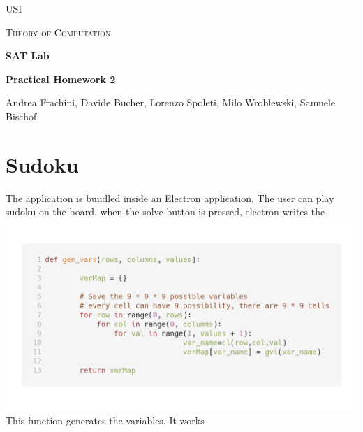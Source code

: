 \documentclass[10pt]{article}
\begin{document}
\begin{titlepage}
	\centering
  {\scshape\Large USI\par}
	{\scshape\Large Theory of Computation\par}
	\vspace{1.5cm}
	{\huge\bfseries SAT Lab\par}\vspace{0.5cm}
	{\large\bfseries Practical Homework 2\par}
	\vspace{2cm}
	{\Large Andrea Frachini, Davide Bucher, Lorenzo Spoleti, Milo Wroblewski, Samuele Bischof\par}

\end{titlepage}


\section*{Sudoku}
The application is bundled inside an Electron application.
The user can play sudoku on the board, when the solve button is pressed,
electron writes the
\includegraphics[width=\linewidth]{genVars.png}
This function generates the variables. It works
\end{document}
